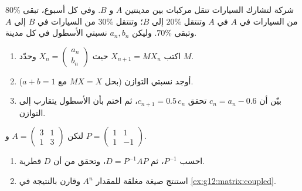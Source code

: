\begin{exercise}[$\star\star$]\label{exo:g12:matrix:7}
شركة لتشارك السيارات تنقل مركبات بين مدينتين $A$ و $B$. وفي كل
أسبوع، تبقى $80\%$ من السيارات في $A$ في $A$ وتنتقل $20\%$ إلى $B$؛ وتنتقل $30\%$
من السيارات في $B$ إلى $A$ وتبقى $70\%$. وليكن $a_n, b_n$
نسبتي الأسطول في كل مدينة.
\begin{omfigure}
\end{omfigure}
\begin{enumerate}
  \item اكتب $X_{n+1} = MX_n$ حيث
        $X_n = \begin{pmatrix} a_n\\ b_n\end{pmatrix}$ وحدّد $M$.
  \item أوجد نسبتي التوازن (بحل $MX = X$ مع
        $a + b = 1$).
  \item بيّن أن $c_n = a_n - 0.6$ تحقق $c_{n+1} = 0.5\,c_n$، ثم
        اختم بأن  الأسطول يتقارب إلى التوازن.
\end{enumerate}
\end{exercise}

\begin{exercise}[$\star\star\star$]\label{exo:g12:matrix:8}
لتكن $A = \begin{pmatrix} 3 & 1\\ 1 & 3 \end{pmatrix}$ و
$P = \begin{pmatrix} 1 & 1\\ 1 & -1 \end{pmatrix}$.
\begin{enumerate}
  \item احسب $P^{-1}$، ثم $D = P^{-1}AP$، وتحقق من أن $D$
        قطرية.
  \item استنتج صيغة مغلقة للمقدار $A^n$ وقارن بالنتيجة في
        \cref{ex:g12:matrix:coupled}.
\end{enumerate}
\end{exercise}


